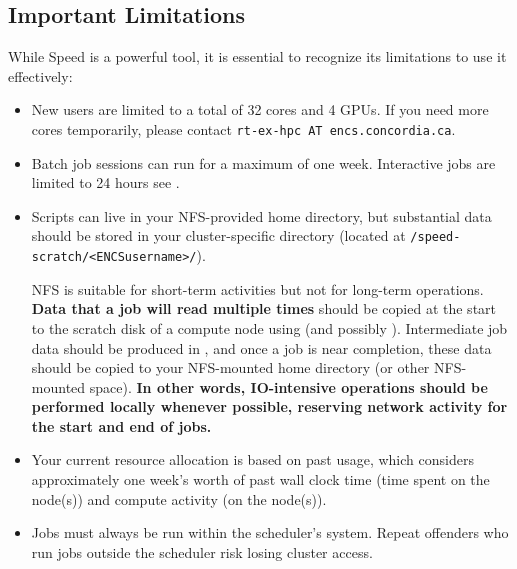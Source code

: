 \documentclass{easychair}
\begin{document}
\subsection{Important Limitations}
\label{sect:limitations}

While Speed is a powerful tool, it is essential to recognize its limitations to use it effectively:

\begin{itemize}
	\item
	New users are limited to a total of 32 cores and 4 GPUs. If you need more cores temporarily,
	please contact \texttt{rt-ex-hpc AT encs.concordia.ca}.

	\item
	Batch job sessions can run for a maximum of one week. 
	Interactive jobs are limited to 24 hours see .

	\item
	Scripts can live in your NFS-provided home directory, but substantial data 
	should be stored in your cluster-specific directory (located at \verb+/speed-scratch/<ENCSusername>/+).

	NFS is suitable for short-term activities but not for long-term operations.
	\textbf{Data that a job will read multiple times} should be copied at the start to the scratch disk of a compute node using
	 (and possibly ). 
	Intermediate job data should be produced in , and once a job is near completion,
	these data should be copied to your NFS-mounted home directory (or other NFS-mounted space).
	\textbf{In other words, IO-intensive operations should be performed locally whenever possible, 
	reserving network activity for the start and end of jobs.}

	\item
	Your current resource allocation is based on past usage,
	which considers approximately one week's worth of past wall clock time 
	(time spent on the node(s)) and compute activity (on the node(s)).

	\item
	Jobs must always be run within the scheduler's system. Repeat offenders who 
	run jobs outside the scheduler risk losing cluster access.
\end{itemize}

\end{document}
